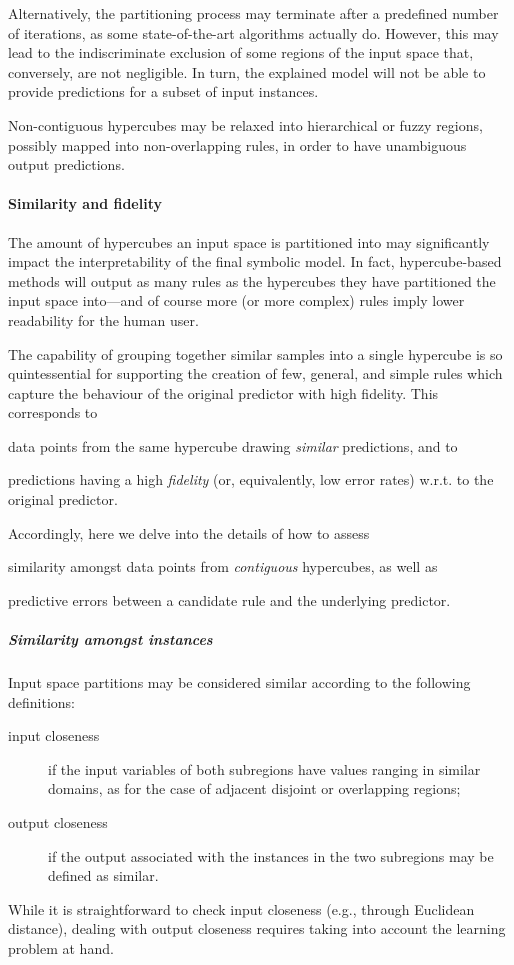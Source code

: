 \documentclass[
]{ceurart}
\begin{document}
Alternatively, the partitioning process may terminate after a predefined number of iterations, as some state-of-the-art algorithms actually do.
%
However, this may lead to the indiscriminate exclusion of some regions of the input space that, conversely, are not negligible.
%
In turn, the explained model will not be able to provide predictions for a subset of input instances.

Non-contiguous hypercubes may be relaxed into hierarchical or fuzzy regions, possibly mapped into non-overlapping rules, in order to have unambiguous output predictions.

\paragraph{Similarity and fidelity}

The amount of hypercubes an input space is partitioned into may significantly impact the interpretability of the final symbolic model.
%
In fact, hypercube-based methods will output as many rules as the hypercubes they have partitioned the input space into---and of course more (or more complex) rules imply lower readability for the human user.

The capability of grouping together similar samples into a single hypercube is so quintessential for supporting the creation of few, general, and simple rules which capture the behaviour of the original predictor with high fidelity.
%
This corresponds to
%
\begin{inlinelist}
	\item data points from the same hypercube drawing \emph{similar} predictions, and to
	\item predictions having a high \emph{fidelity} (or, equivalently, low error rates) w.r.t. to the original predictor.
\end{inlinelist}
%
Accordingly, here we delve into the details of how to assess
%
\begin{inlinelist}
	\item similarity amongst data points from \emph{contiguous} hypercubes, as well as
	\item predictive errors between a candidate rule and the underlying predictor.
\end{inlinelist}

\subparagraph{Similarity amongst instances}

Input space partitions may be considered similar according to the following definitions:
%
\begin{description}
	\item[input closeness] if the input variables of both subregions have values ranging in similar domains, as for the case of adjacent disjoint or overlapping regions;
	\item[output closeness] if the output associated with the instances in the two subregions may be defined as similar.
\end{description}
%
While it is straightforward to check input closeness (e.g., through Euclidean distance), dealing with output closeness requires taking into account the learning problem at hand.
\end{document}
